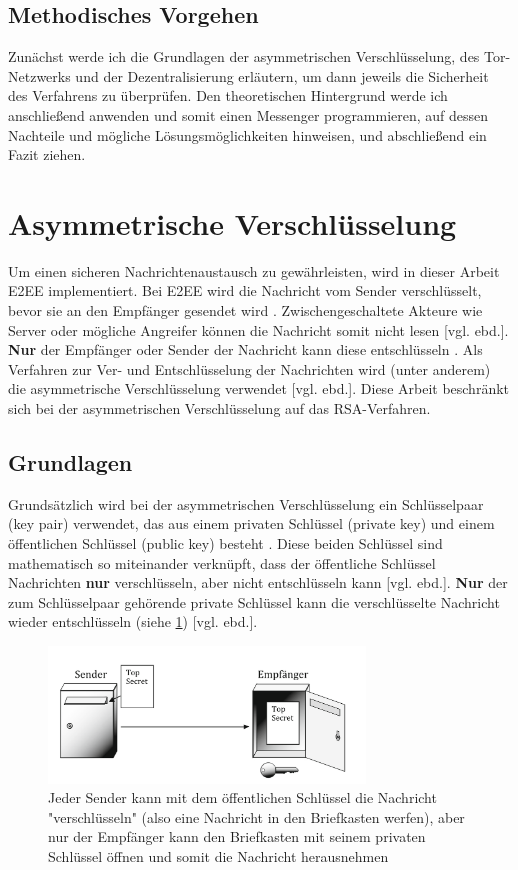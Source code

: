 \documentclass[a4paper,ngerman, headheight=28pt,12pt]{scrartcl}
\newcommand{\vcite}[1]{\cite[vgl.][]{#1}}
\newcommand{\vebd}{[vgl. ebd.]}
\begin{document}
\subsection{Methodisches Vorgehen}
Zunächst werde ich die Grundlagen der asymmetrischen Verschlüsselung, des Tor-Netzwerks und der Dezentralisierung erläutern, um dann jeweils die Sicherheit des Verfahrens zu überprüfen. Den theoretischen Hintergrund werde ich anschließend anwenden und somit einen Messenger programmieren, auf dessen Nachteile und mögliche Lösungsmöglichkeiten hinweisen, und abschließend ein Fazit ziehen.

\section{Asymmetrische Verschlüsselung}
Um einen sicheren Nachrichtenaustausch zu gewährleisten, wird in dieser Arbeit E2EE implementiert. Bei E2EE wird die Nachricht vom Sender verschlüsselt, bevor sie an den Empfänger gesendet wird \vcite{E2EE}. Zwischengeschaltete Akteure wie Server oder mögliche Angreifer können die Nachricht somit nicht lesen \vebd. \textbf{Nur} der Empfänger oder Sender der Nachricht kann diese entschlüsseln \vcite{E2EE-Method}. Als Verfahren zur Ver- und Entschlüsselung der Nachrichten wird (unter anderem) die asymmetrische Verschlüsselung verwendet \vebd. Diese Arbeit beschränkt sich bei der asymmetrischen Verschlüsselung auf das RSA-Verfahren.

\subsection{Grundlagen}
Grundsätzlich wird bei der asymmetrischen Verschlüsselung ein Schlüsselpaar (key pair) verwendet, das aus einem privaten Schlüssel (private key) und einem öffentlichen Schlüssel (public key) besteht \vcite{Rsa-Basics}. Diese beiden Schlüssel sind mathematisch so miteinander verknüpft, dass der öffentliche Schlüssel Nachrichten \textbf{nur} verschlüsseln, aber nicht entschlüsseln kann \vebd. \textbf{Nur} der zum Schlüsselpaar gehörende private Schlüssel kann die verschlüsselte Nachricht wieder entschlüsseln (siehe \cref{fig:E2EE}) \vebd.
\begin{figure}[ht]
  \centering
  \includegraphics[width=0.75\textwidth]{Briefkasten-asymm.png}
  \caption{Jeder Sender kann mit dem öffentlichen Schlüssel die Nachricht "verschlüsseln" (also eine Nachricht in den Briefkasten werfen), aber nur der Empfänger kann den Briefkasten mit seinem privaten Schlüssel öffnen und somit die Nachricht herausnehmen \vcite{fig:Rsa-Cryptography} \label{fig:E2EE}}
\end{figure}
\end{document}

